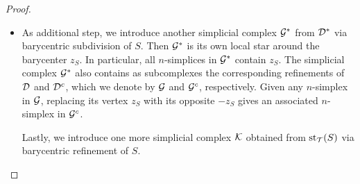 \documentclass[10pt,a4paper]{article}
\begin{document}
\begin{proof}
\begin{itemize}
        \item 
        As additional step, we introduce another simplicial complex ${\mathcal G}^\ast$ from ${\mathcal D}^\ast$ via barycentric subdivision of $S$.
        Then ${\mathcal G}^\ast$ is its own local star around the barycenter $z_S$.
        In particular, all $n$-simplices in ${\mathcal G}^\ast$ contain $z_{S}$. 
        The simplicial complex ${\mathcal G}^\ast$ also contains as subcomplexes the corresponding refinements of ${\mathcal D}$ and ${\mathcal D}^{c}$, 
        which we denote by ${\mathcal G}$ and ${\mathcal G}^{c}$, respectively.
        Given any $n$-simplex in ${\mathcal G}$, replacing its vertex $z_{S}$ with its opposite $-z_{S}$ gives an associated $n$-simplex in ${\mathcal G}^{c}$.
        
        Lastly, we introduce one more simplicial complex ${\mathcal K}$ obtained from $\operatorname{st}_{{\mathcal T}}(S)$ via barycentric refinement of $S$. 
        




\end{itemize}
\end{proof}
\end{document}
